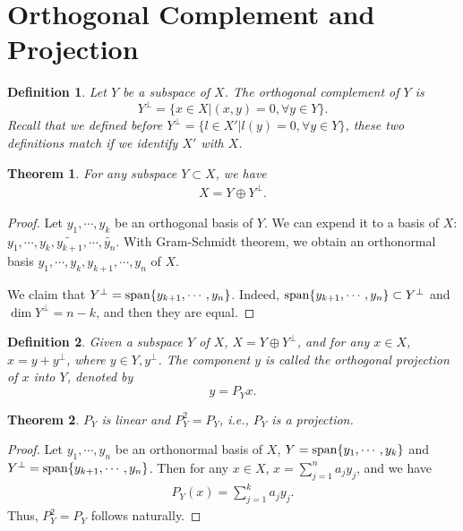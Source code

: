 \documentclass[11pt]{book}
\newtheorem{definition}{Definition}[section]
\newtheorem{theorem}{Theorem}[section]
\theoremstyle{definition}
\numberwithin{equation}{chapter}
\begin{document}
\medskip

\section{Orthogonal Complement and Projection}
\begin{definition}
Let $Y$ be a subspace of $X$. The orthogonal complement of $Y$ is $$Y^\perp = \{x\in X | (x,y) = 0, \forall y \in Y\}.$$
Recall that we defined before $Y^\perp = \{l\in X' | l(y) = 0, \forall y \in Y\}$, these two definitions match if we identify $X'$ with $X$.
\end{definition}


\medskip

\begin{theorem}
For any subspace $Y\subset X$, we have
\begin{align*}
    X = Y \oplus Y^\perp.
\end{align*}
\end{theorem}
\begin{proof}
Let $y_1,\cdots,y_k$ be an orthogonal basis of $Y$. We can expend it to a basis of $X$: $y_1,\cdots,y_k, \widetilde{y_{k+1}}, \cdots, \widetilde{y_{n}}$. With Gram-Schmidt theorem, we obtain an orthonormal basis $y_1,\cdots,y_k,y_{k+1},\cdots,y_n$ of $X$. 

We claim that $Y^\perp = {\rm span}\{y_{k+1},\cdots,y_n\}$. Indeed, ${\rm span}\{y_{k+1},\cdots,y_n\}\subset Y^\perp$ and $\dim Y^\perp = n-k$, and then they are equal.
\end{proof}

\medskip

\begin{definition}
Given a subspace $Y$ of $X$, $X = Y \oplus Y^\perp$, and for any $x\in X$, $x = y + y^\perp$, where $y\in Y, y^\perp$. The component $y$ is called the orthogonal projection of $x$ into $Y$, denoted by $$y = P_Y x.$$ 
\end{definition}

\medskip

\begin{theorem}
$P_Y$ is linear and $P_Y^2 = P_Y$, i.e., $P_Y$ is a projection.
\end{theorem}
\begin{proof}
Let $y_1,\cdots,y_n$ be an orthonormal basis of $X$, $Y = {\rm span}\{y_1,\cdots,y_k\}$ and $Y^\perp = {\rm span}\{y_{k+1},\cdots,y_n\}$. Then for any $x\in X$, $x = \sum^n_{j=1}a_j y_j$, and we have
\begin{align*}
    P_Y(x) = \sum^k_{j=1} a_j y_j.
\end{align*}
Thus, $P_Y^2 = P_Y$ follows naturally.
\end{proof}
\end{document}
